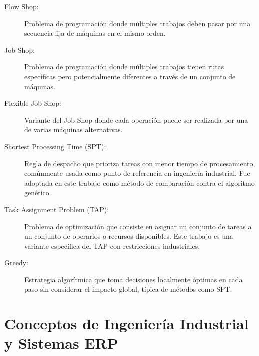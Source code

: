 \begin{description}
    \item[Flow Shop:] Problema de programación donde múltiples trabajos deben pasar por una secuencia fija de máquinas en el mismo orden.
    
    \item[Job Shop:] Problema de programación donde múltiples trabajos tienen rutas específicas pero potencialmente diferentes a través de un conjunto de máquinas.
    
    \item[Flexible Job Shop:] Variante del Job Shop donde cada operación puede ser realizada por una de varias máquinas alternativas.
    
    \item[Shortest Processing Time (SPT):] Regla de despacho que prioriza tareas con menor tiempo de procesamiento, comúnmente usada como punto de referencia en ingeniería industrial. Fue adoptada en este trabajo como método de comparación contra el algoritmo genético.
    
    \item[Task Assignment Problem (TAP):] Problema de optimización que consiste en asignar un conjunto de tareas a un conjunto de operarios o recursos disponibles. Este trabajo es una variante específica del TAP con restricciones industriales.
    
    \item[Greedy:] Estrategia algorítmica que toma decisiones localmente óptimas en cada paso sin considerar el impacto global, típica de métodos como SPT.
\end{description}

\section*{Conceptos de Ingeniería Industrial y Sistemas ERP}

